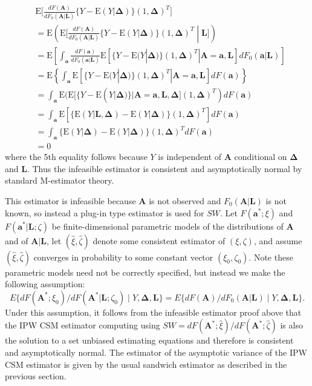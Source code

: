 \documentclass[12pt]{article}
\begin{document}
\begin{align*}
&\text{E} \bigg[\frac{dF(\bm{A})}{dF_{0}(\bm{A} | \bm{L})} \{ Y - \text{E}(Y | \bm{\Delta})\} (1, \bm{\Delta})^{T} \bigg] \\
&= \text{E} \left( \text{E} \bigg[\frac{dF(\bm{A})}{dF_{0}(\bm{A} | \bm{L})} \{ Y - \text{E}(Y | \bm{\Delta}) \} (1, \bm{\Delta})^{T} \middle| \bm{L} \bigg] \right) \\
&= \text{E} \left [ \int_{\bm{a}} \frac{dF(\bm{a})}{dF_{0}(\bm{a} | \bm{L})} \text{E} [ \{ Y - \text{E}(Y | \bm{\Delta}) \} (1, \bm{\Delta})^{T} | \bm{A} = \bm{a}, \bm{L} ] dF_{0}(\bm{a} | \bm{L}) \right ] \\
&= \text{E} \left \{ \int_{\bm{a}} \text{E} [ \{ Y - \text{E}(Y | \bm{\Delta}) \} (1, \bm{\Delta})^{T} | \bm{A} = \bm{a}, \bm{L} ] dF(\bm{a}) \right \} \\
&= \int_{\bm{a}} \text{E} ( \text{E} [ \{ Y - \text{E}(Y | \bm{\Delta}) \} | \bm{A} = \bm{a}, \bm{L}, \bm{\Delta} ] (1, \bm{\Delta})^{T} ) dF(\bm{a})  \\
&= \int_{\bm{a}} \text{E} [ \{ \text{E} (Y | \bm{L}, \bm{\Delta}) - \text{E}(Y | \bm{\Delta}) \} (1, \bm{\Delta})^{T} ] dF(\bm{a})  \\
&= \int_{\bm{a}} \{ \text{E} (Y | \bm{\Delta}) - \text{E}(Y | \bm{\Delta}) \} (1, \bm{\Delta})^{T} dF(\bm{a})  \\
&= 0
\end{align*}
where the 5th equality follows because $Y$ is independent of $\bm{A}$ conditional on $\bm{\Delta}$ and $\bm{L}$. Thus the infeasible estimator is consistent and asymptotically normal by standard M-estimator theory.

This estimator is infeasible because $\bm{A}$ is not observed and  $F_0(\bm{A} | \bm{L})$ is not known, so instead a plug-in type estimator is used  for $SW$. Let $F(\bm{a}^{*}; \xi)$ and $F(\bm{a}^{*} | \bm{L}; \zeta)$ be finite-dimensional parametric models of the distributions of $\bm{A}$ and of $\bm{A} | \bm{L}$, let $(\hat \xi,\hat \zeta)$ denote some consistent estimator of $(\xi,\zeta)$, and assume $(\hat \xi, \hat \zeta)$ converges in probability to some constant vector $(\xi_0,\zeta_0)$. Note these parametric models need not be correctly specified, but instead we make the following assumption: $$E\{ dF(\bm{A}^{*}; \xi_0)/dF(\bm{A}^{*} | \bm{L}; \zeta_0) \mid Y,\bm{\Delta},\bm{L}\}= E\{dF(\bm{A})/dF_0(\bm{A} | \bm{L}) \mid Y,\bm{\Delta},\bm{L}\}.$$  Under this assumption, it follows from the infeasible estimator proof above that the IPW CSM estimator computing using $SW= dF(\bm{A}^{*};\hat \xi) / dF(\bm{A}^{*}; \hat \zeta)$ is also the solution to a set unbiased estimating equations and therefore is consistent and asymptotically normal. The estimator of the asymptotic variance of the IPW CSM estimator is given by the usual sandwich estimator as described in the previous section.
\end{document}

